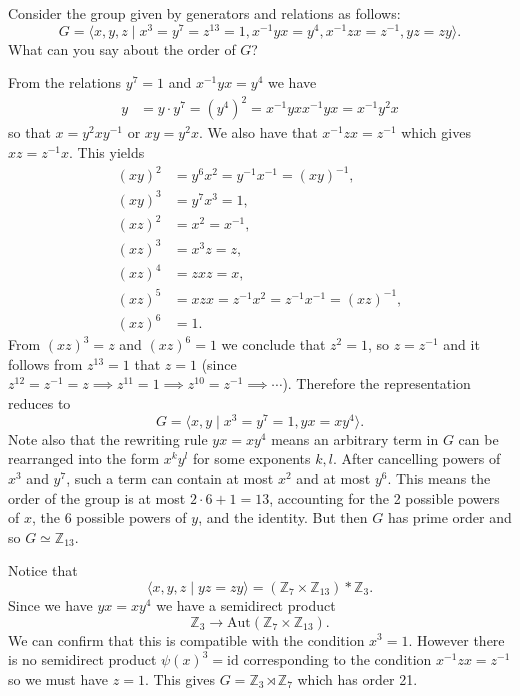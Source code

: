 \documentclass{article}
\newcounter{Problem}
\newenvironment{Problem}{\begin{Exercise}[name={Problem},
                                          counter={Problem}]}
                        {\end{Exercise}}
\begin{document}
\pagebreak

\begin{Problem}
Consider the group given by generators and relations as follows:
$$
G = \langle
      x, y, z
    \mid
      x^3 = y^7 = z^{13} = 1,
      x^{-1} y x = y^4,
      x^{-1} z x = z^{-1},
      yz = zy
    \rangle.
$$
What can you say about the order of $G$?
\end{Problem}

\begin{Answer}
From the relations $y^7 = 1$ and $x^{-1} y x = y^4$ we have
\begin{align*}
   y
&= y \cdot y^7
 = (y^4)^2
 = x^{-1} y x x^{-1} y x
 = x^{-1} y^2 x
\end{align*}
so that $x = y^2 x y^{-1}$ or $xy = y^2 x$.
We also have that $x^{-1}zx = z^{-1}$ which gives
$xz = z^{-1}x$. This yields
\begin{align*}
(xy)^2 &= y^6 x^2 = y^{-1} x^{-1} = (xy)^{-1}, \\
(xy)^3 &= y^7 x^3 = 1, \\
(xz)^2 &= x^2 = x^{-1}, \\
(xz)^3 &= x^3z = z, \\
(xz)^4 &= zxz = x, \\
(xz)^5 &= xzx = z^{-1} x^2 = z^{-1} x^{-1} = (xz)^{-1}, \\
(xz)^6 &= 1.
\end{align*}
From $(xz)^3 = z$ and $(xz)^6 = 1$ we conclude that $z^2 = 1$, so
$z = z^{-1}$ and it follows from $z^{13} = 1$ that $z = 1$
(since
$z^{12} = z^{-1} = z \implies z^{11} = 1 \implies z^{10} = z^{-1}
\implies \cdots$).
Therefore the representation reduces to
$$
G = \langle x, y \mid x^3 = y^7 = 1, yx = xy^4 \rangle.
$$
Note also that the rewriting rule $yx = xy^4$ means an arbitrary term
in $G$ can be rearranged into the form $x^k y^l$ for some exponents
$k, l$. After cancelling powers of
$x^3$ and $y^7$, such a term can contain at most $x^2$ and at most
$y^6$. This means the order of the group is at most $2 \cdot 6 + 1 = 13$,
accounting for the 2 possible powers of $x$, the 6 possible powers of
$y$, and the identity. But then $G$ has prime order and so
$G \simeq \mathbb{Z}_{13}$.

Notice that
$$
  \langle x, y, z \mid yz = zy \rangle
= (\mathbb{Z}_7 \times \mathbb{Z}_{13}) \ast \mathbb{Z}_3.
$$
Since we have $yx = xy^4$ we have a semidirect product
$$
\mathbb{Z}_3 \to \mathrm{Aut}(\mathbb{Z}_7 \times \mathbb{Z}_{13}).
$$
We can confirm that this is compatible with the condition $x^3 =
1$. However there is no semidirect product $\psi(x)^3 = \mathrm{id}$
corresponding to the condition $x^{-1} z x = z^{-1}$ so we must have
$z = 1$. This gives $G = \mathbb{Z}_{3} \rtimes \mathbb{Z}_7$ which
has order 21.

\end{Answer}
\end{document}
